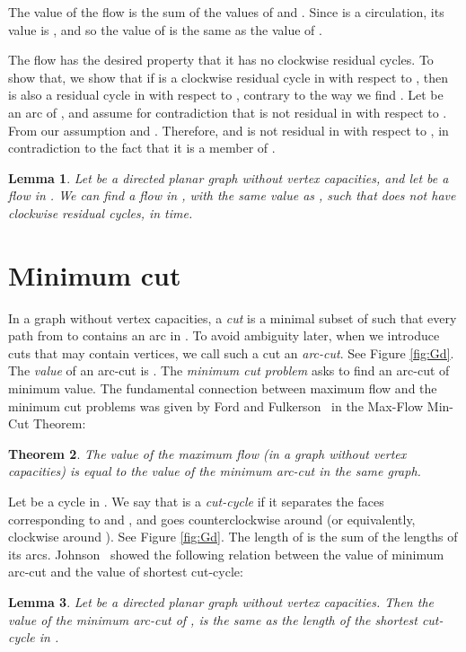 \documentclass[a4paper,11pt]{article}
\newtheorem{theorem}{Theorem}[section]
\newtheorem{lemma}[theorem]{Lemma}
\begin{document}
The value of the flow  is the sum of the values of  and . Since
 is a circulation, its value is , and so the value of  is the
same as the value of .

The flow  has the desired property that it has no clockwise residual
cycles. To show that, we show that if  is a clockwise residual cycle in
 with respect to , then  is also a residual cycle in 
with respect to , contrary to the way we find .
Let  be an arc of , and assume for contradiction
that  is not residual in  with respect to .  From our
assumption  and .
Therefore,  and  is not residual in  with respect to , in
contradiction to the fact that it is a member of .

\begin{lemma}
	Let  be a directed planar graph without vertex capacities, and let  be a flow in . We can find a flow  in , with the same value as , such that  does not have clockwise residual cycles, in  time.
\end{lemma}


\section{Minimum cut} \label{sec:cut}

In a graph without vertex capacities, a \emph{cut}  is a minimal subset of  such that every path from  to  contains an arc in . To avoid ambiguity later, when we introduce cuts that may contain vertices, we call such a cut an \emph{arc-cut}. See Figure \ref{fig:Gd}. The \emph{value} of an arc-cut  is . The \emph{minimum cut problem} asks to find an arc-cut of minimum value. The fundamental connection between maximum flow and the minimum cut problems was given by Ford and Fulkerson~\cite{FF62} in the Max-Flow Min-Cut Theorem:
\begin{theorem}\cite{FF62} \label{thm:mfmc}
    The value of the maximum flow (in a graph without vertex capacities) is equal to the value of the minimum arc-cut in the same graph.
\end{theorem}

Let  be a cycle in . We say that  is a \emph{cut-cycle} if
it separates the faces corresponding to  and , and goes
counterclockwise around  (or equivalently, clockwise around ).
See Figure \ref{fig:Gd}. The length of  is the sum of the lengths of its
 arcs. Johnson~\cite{J87} showed the following relation between
the value of minimum arc-cut and the value of shortest cut-cycle:
\begin{lemma} \cite{J87} \label{lem:mcc}
    Let  be a directed planar graph without vertex capacities. Then the value of the minimum arc-cut of , is the same as the length of the shortest cut-cycle in .
\end{lemma}
\end{document}
